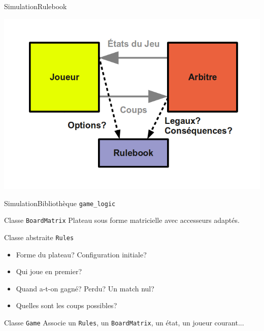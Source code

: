 
\begin{frame}{Simulation}{Rulebook}

\includegraphics[width=\textwidth]{img/env_sim/rulebook}

\end{frame}



\begin{frame}{Simulation}{Bibliothèque \texttt{game\_logic}}

\begin{block}{Classe \texttt{BoardMatrix}}
Plateau sous forme matricielle avec accesseurs adaptés.
\end{block}

\pause

\begin{block}{Classe abstraite \texttt{Rules}}
\begin{itemize}
\item Forme du plateau? Configuration initiale?
\item Qui joue en premier?
\item Quand a-t-on gagné? Perdu? Un match nul?
\item Quelles sont les coups possibles?
\end{itemize}
\end{block}

\pause

\begin{block}{Classe \texttt{Game}}
Associe un \texttt{Rules}, un \texttt{BoardMatrix}, un état, un joueur courant...
\end{block}

\end{frame}
